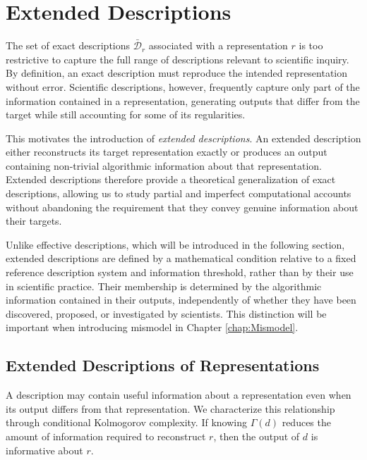 %
%

\section{Extended Descriptions}
\label{sec:extended_descriptions}

The set of exact descriptions $\bar{\mathcal{D}}_r$ associated with a representation $r$ is too restrictive to capture the full range of descriptions relevant to scientific inquiry. By definition, an exact description must reproduce the intended representation without error. Scientific descriptions, however, frequently capture only part of the information contained in a representation, generating outputs that differ from the target while still accounting for some of its regularities.

This motivates the introduction of \emph{extended descriptions}. An extended description either reconstructs its target representation exactly or produces an output containing non-trivial algorithmic information about that representation. Extended descriptions therefore provide a theoretical generalization of exact descriptions, allowing us to study partial and imperfect computational accounts without abandoning the requirement that they convey genuine information about their targets.

Unlike effective descriptions, which will be introduced in the following section, extended descriptions are defined by a mathematical condition relative to a fixed reference description system and information threshold, rather than by their use in scientific practice. Their membership is determined by the algorithmic information contained in their outputs, independently of whether they have been discovered, proposed, or investigated by scientists. This distinction will be important when introducing mismodel in Chapter \ref{chap:Mismodel}.


\subsection*{Extended Descriptions of Representations}

A description may contain useful information about a representation even when its output differs from that representation. We characterize this relationship through conditional Kolmogorov complexity. If knowing $\Gamma(d)$ reduces the amount of information required to reconstruct $r$, then the output of $d$ is informative about $r$.

